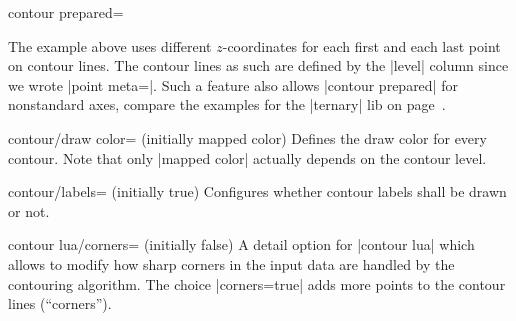 {{\begin{plottype}[/pgfplots]{contour prepared=\textcolor{black}{}}
\begin{codeexample}[]
\end{codeexample}
    \noindent The example above uses different $z$-coordinates for each first
    and each last point on contour lines. The contour lines as such are defined
    by the |level| column since we wrote |point meta=|. Such a
    feature also allows |contour prepared| for nonstandard axes, compare the
    examples for the |ternary| lib on page~\pageref{page:ternary:contour}.

    \begin{pgfplotskey}{contour/draw color= (initially mapped color)}
        Defines the draw color for every contour. Note that only |mapped color|
        actually depends on the contour level.
    \end{pgfplotskey}

    \begin{pgfplotskey}{contour/labels= (initially true)}
        Configures whether contour labels shall be drawn or not.
    \end{pgfplotskey}

    \begin{pgfplotskey}{contour lua/corners= (initially false)}
        A detail option for |contour lua| which allows to modify how sharp corners in the input data are handled by the contouring algorithm. The choice |corners=true| adds more points to the contour lines (``corners'').
\begin{codeexample}[]
~
\end{codeexample}
    \end{pgfplotskey}


\end{plottype}}}

